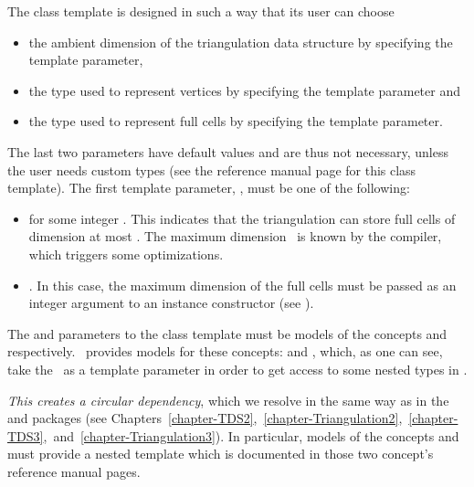 The 
class template is designed in such a way that its user can choose
\begin{itemize}
\item the ambient dimension of the triangulation data structure by specifying the  template parameter,
\item the type used to represent vertices by specifying the 
template parameter and
\item the type used to represent full cells by specifying the
 template parameter.
\end{itemize}

The last two parameters have default values and are thus not necessary, unless
the user needs custom types (see the reference manual page for this class
template). The first template parameter, , must be
one of the following:
\begin{itemize}
\item \ccPureGlobalScope{} for some integer \ad. This
indicates that the triangulation can store full cells of dimension at most
\ad. The maximum dimension \ad\ is known by the compiler, which
triggers some optimizations. 
\item \ccPureGlobalScope{}. In this case, the maximum
dimension of the full cells must be passed as an integer argument to an instance
constructor (see ).
\end{itemize}

The  and  parameters to the class template
must be models of the concepts  and
 respectively. \cgal\ provides models for these
concepts:  and
, which, as one
can see, take the \tds\ as a template parameter in order to get access to
some nested types in \tds.

{\em This creates a circular dependency}, which we resolve in the same way
as in the \cgal\  and  packages (see
Chapters~\ref{chapter-TDS2},~\ref{chapter-Triangulation2},~\ref{chapter-TDS3},~and~\ref{chapter-Triangulation3}).
In particular, models of the concepts  and
 must provide a nested template 
which is documented in those two concept's reference manual pages.

